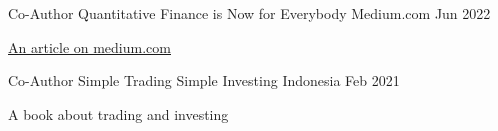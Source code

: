 

\begin{cventries}

  \cventry
    {Co-Author} %
    {Quantitative Finance is Now for Everybody} %
    {Medium.com} %
    {Jun 2022} %
    {
      \begin{cvitems} %
        \item {\href{https://medium.com/@nikkisatmaka/quantitative-finance-is-now-for-everybody-a13947f91a74A book about trading and investing}{An article on medium.com}}
      \end{cvitems}
    }

  \cventry
    {Co-Author} %
    {Simple Trading Simple Investing} %
    {Indonesia} %
    {Feb 2021} %
    {
      \begin{cvitems} %
        \item {A book about trading and investing}
      \end{cvitems}
    }

\end{cventries}
